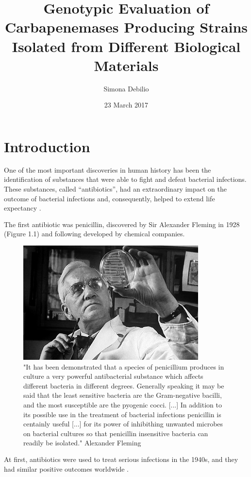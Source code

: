 \documentclass[11pt]{report}
\title{\textbf{Genotypic Evaluation of Carbapenemases Producing Strains Isolated from Different Biological Materials}}
\author{Simona Debilio}
\date{23 March 2017}
\begin{document}
\maketitle

\tableofcontents

\chapter{Introduction}
One of the most important discoveries in human history has been the identification of substances that were able to fight and defeat bacterial infections.
These substances, called “antibiotics”, had an extraordinary impact on the outcome of bacterial infections and, consequently, helped to extend life expectancy \cite{ventola2015antibiotic}.

The first antibiotic was penicillin, discovered by Sir Alexander Fleming in 1928 (Figure 1.1) and following developed by chemical companies.

\begin{figure}[htp]
\centering
\includegraphics[scale=1.10]{immagini gamalero/Fleming_piastra.jpg}
\caption{"It has been demonstrated that a species of penicillium produces in culture a very powerful antibacterial substance which affects different bacteria in different degrees. Generally speaking it may be said that the least sensitive bacteria are the Gram-negative bacilli, and the most susceptible are the pyogenic cocci. [...] In addition to its possible use in the treatment of bacterial infections penicillin is centainly useful [...] for its power of inhibithing unwanted microbes on bacterial cultures so that penicillin insensitive bacteria can readily be isolated." Alexander Fleming }
\label{}
\end{figure}

\clearpage
At first, antibiotics were used to treat serious infections in the 1940s, and they had similar positive outcomes worldwide \cite{Spellberg2014}.
\end{document}
